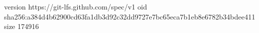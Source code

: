 version https://git-lfs.github.com/spec/v1
oid sha256:a384d4b62900cd63fa1db3d92c32dd9727e7bc65eca7b1eb8e6782b34bdee411
size 174916
